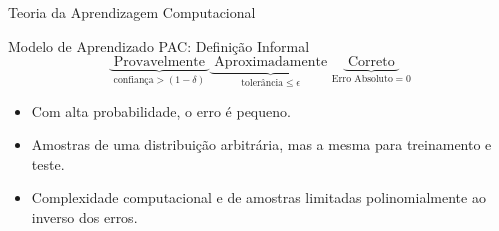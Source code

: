 \documentclass[10pt, professionalfonts]{beamer}
\begin{document}
{\begin{frame}{Teoria da Aprendizagem Computacional}
      \pause
      
  \end{frame}
  \begin{frame}{Modelo de Aprendizado PAC: Definição Informal}
    \begin{equation}
      \underbrace{\text{ Provavelmente }}_{\textrm{confiança} >(1-\delta)}
      \underbrace{\text{ Aproximadamente }}_{\textrm{tolerância} \leq\epsilon}
      \underbrace{\text{   Correto   }}_{\textrm{Erro Absoluto} = 0} \nonumber
    \end{equation}
    \pause
  \begin{itemize}
    \item Com alta probabilidade, o erro é pequeno.
    \item Amostras de uma distribuição arbitrária, mas a mesma para treinamento e teste.
    \item Complexidade computacional e de amostras limitadas polinomialmente ao inverso dos erros.
  \end{itemize}
  \end{frame}
}
\end{document}
